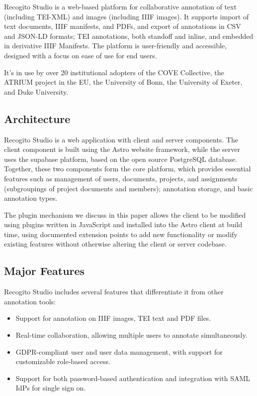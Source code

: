 \documentclass[final]{anthology-ch}         %
\begin{document}
Recogito Studio is a web-based platform for collaborative annotation of text (including TEI-XML) and images (including IIIF images). It supports import of text documents, IIIF manifests, and PDFs, and export of annotations in CSV and JSON-LD formats; TEI annotations, both standoff and inline, and embedded in derivative IIIF Manifests. The platform is user-friendly and accessible, designed with a focus on ease of use for end users.

It's in use by over 20 institutional adopters of the COVE Collective, the ATRIUM project in the EU, the University of Bonn, the University of Exeter, and Duke University.

\subsection{Architecture} \label{sec:overview_architecture}

Recogito Studio is a web application with client and server components. The client component is built using the Astro website framework, while the server uses the supabase platform, based on the open source PostgreSQL database. Together, these two components form the core platform, which provides essential features such as management of users, documents, projects, and assignments (subgroupings of project documents and members); annotation storage, and basic annotation types. 

The plugin mechanism we discuss in this paper allows the client to be modified using plugins written in JavaScript and installed into the Astro client at build time, using documented extension points to add new functionality or modify existing features without otherwise altering the client or server codebase.

\subsection{Major Features} \label{sec:overview_features}

Recogito Studio includes several features that differentiate it from other annotation tools:
\begin{itemize}
  \item Support for annotation on IIIF images, TEI text and PDF files.
  \item Real-time collaboration, allowing multiple users to annotate simultaneously.
  \item GDPR-compliant user and user data management, with support for customizable role-based access.
  \item Support for both password-based authentication and integration with SAML IdPs for single sign on. 
\end{itemize}
\end{document}
